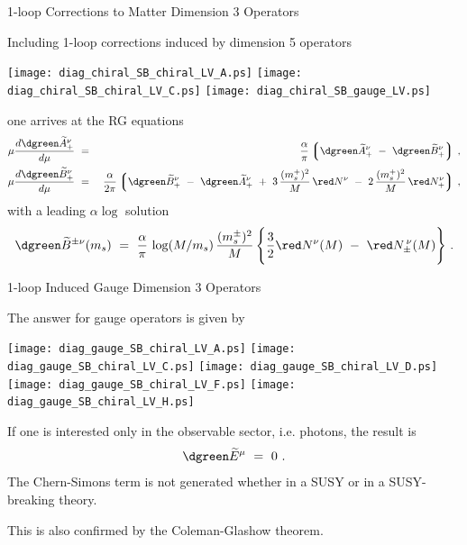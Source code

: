 \documentclass[pdf,PItalk,slideColor,colorBG,accumulate]{prosper}
\newcommand{\myit}{\usefont{T1}{ppl}{m}{it}\fontsize{8pt}{6pt}\selectfont}
\newcommand{\wt}{\widetilde}
\begin{document}
{
\begin{slide}[Replace]{ 1-loop Corrections to Matter Dimension 3 Operators }

	Including 1-loop corrections induced by dimension 5 operators
\vspace{0.3cm}
\begin{center}
\texttt{[image: diag\_chiral\_SB\_chiral\_LV\_A.ps]} 
\texttt{[image: diag\_chiral\_SB\_chiral\_LV\_C.ps]} 
\texttt{[image: diag\_chiral\_SB\_gauge\_LV.ps]}
\end{center}
	one arrives at the RG equations
\begin{eqnarray*}
\nonumber
\mu\frac{d {\dgreen \wt{A}_+^\nu}}{d\mu} 
& ~=~ &
\frac{\alpha}{\pi} \,  \Big\lgroup  {\dgreen \wt{A}_+^\nu}
~-~{\dgreen \wt{B}_+^\nu} \Big\rgroup~, 
        \\
\mu\frac{d {\dgreen \wt{B}_+^\nu}}{d\mu} 
& ~=~ &
\frac{\alpha}{2\pi} \, \Big\lgroup
{\dgreen \wt{B}_+^\nu}  ~-~ {\dgreen \wt{A}_+^\nu}  
~+~3\, \frac{(m_s^+)^2}{M}\, {\red N^\nu}
~-~2\, \frac{(m_s^+)^2}{M}\, {\red N_+^\nu}
\Big\rgroup~,
\end{eqnarray*}
%
	with a leading $ \alpha \log $ solution
\begin{equation*}
{\dgreen \wt{B}^{\pm\nu}} (m_s) ~=~ \frac{\alpha}{\pi}\, 
\log ( M/m_s )\,
\frac{(m_{s}^\pm)^2 }{M}\, 
\Bigg\{ 
\frac{3}
     {2} {\red N^\nu}(M) 
~-~ {\red N_\pm^{\,\nu}}(M)
\Bigg\}~.
\end{equation*}
%

\end{slide}
}


{
\begin{slide}[Replace]{ 1-loop Induced Gauge Dimension 3 Operators }

	The answer for gauge operators is given by
\vspace{0.5cm}
\begin{center}
\texttt{[image: diag\_gauge\_SB\_chiral\_LV\_A.ps]} 
\texttt{[image: diag\_gauge\_SB\_chiral\_LV\_C.ps]} 
\texttt{[image: diag\_gauge\_SB\_chiral\_LV\_D.ps]} 
\texttt{[image: diag\_gauge\_SB\_chiral\_LV\_F.ps]} 
\texttt{[image: diag\_gauge\_SB\_chiral\_LV\_H.ps]} 
\end{center}
\vspace{0.5cm}
	If one is interested only in the observable sector, 
	{\myit i.e.} photons, the result is
\[
	{\dgreen \wt{E}^\mu} ~=~ 0~.
\]
	The {\myit Chern-Simons term is not generated} whether in
	a SUSY or in a SUSY-breaking theory.

	This is also confirmed by the Coleman-Glashow theorem.

\end{slide}
}
\end{document}
